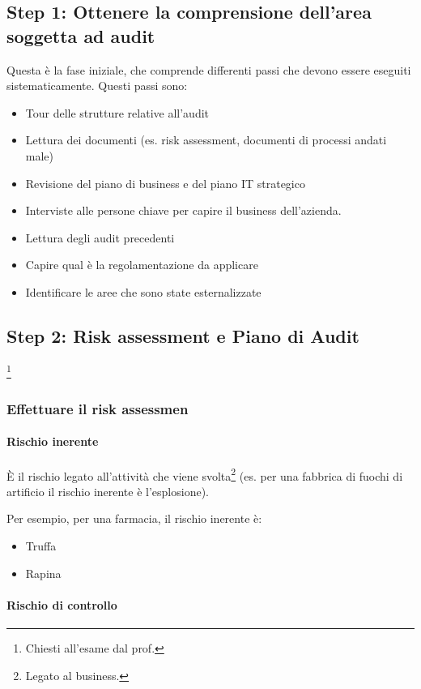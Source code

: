 \subsection{Step 1: Ottenere la comprensione dell'area soggetta ad audit}

Questa è la fase iniziale, che comprende differenti passi che devono essere 
eseguiti sistematicamente.
Questi passi sono:
\begin{itemize} 
\item Tour delle strutture relative all'audit
\item Lettura dei documenti (es. risk assessment, documenti di processi andati 
male)
\item Revisione del piano di business e del piano IT strategico
\item Interviste alle persone chiave per capire il business dell'azienda.
\item Lettura degli audit precedenti
\item Capire qual è la regolamentazione da applicare
\item Identificare le aree che sono state esternalizzate
\end{itemize}

\subsection{Step 2: Risk assessment e Piano di Audit}\footnote{Chiesti all'esame dal prof.}

\subsubsection{Effettuare il risk assessmen}

\paragraph*{Rischio inerente}

È il rischio legato all'attività che viene svolta\footnote{Legato al business.} 
(es. per una fabbrica di fuochi di artificio il rischio inerente è 
l'esplosione).

Per esempio, per una farmacia, il rischio inerente è:
\begin{itemize}
\item Truffa
\item Rapina
\end{itemize}

\paragraph*{Rischio di controllo}

